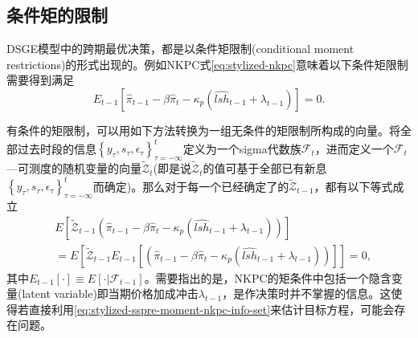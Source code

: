 \subsection{条件矩的限制}
\label{sec:stylized-ssrep-restrictions}
DSGE模型中的跨期最优决策，都是以条件矩限制(conditional moment restrictions)的形式出现的。例如NKPC式\eqref{eq:stylized-nkpc}意味着以下条件矩限制需要得到满足
\begin{equation}
  \label{eq:stylized-sspre-moment-nkpc}
  E_{t-1} \left[
  \hat{\pi}_{t-1} - \beta \hat{\pi}_{t} - \kappa_{p}
  \left(
  \widehat{lsh}_{t-1} + \lambda_{t-1}
  \right)
  \right] = 0.
\end{equation}

有条件的矩限制，可以用如下方法转换为一组无条件的矩限制所构成的向量。将全部过去时段的信息$\left\{ y_{\tau}, s_{\tau}, \epsilon_{\tau} \right\}_{\tau = - \infty}^{t}$定义为一个sigma代数族$\mathcal{F}_{t}$，进而定义一个$\mathcal{F}_{t}$—可测度的随机变量的向量$\widetilde{\mathcal{Z}}_{t}$(即是说$\widetilde{\mathcal{Z}}_{t}$的值可基于全部已有新息$\left\{ y_{\tau}, s_{\tau}, \epsilon_{\tau} \right\}_{\tau = - \infty}^{t}$而确定)。那么对于每一个已经确定了的$\widetilde{\mathcal{Z}}_{t-1}$，都有以下等式成立
\begin{equation}
  \label{eq:stylized-sspre-moment-nkpc-info-set}
\begin{split}
  & E \left[
  \widetilde{\mathcal{Z}}_{t-1}
  \left(
  \hat{\pi}_{t-1} - \beta \hat{\pi}_{t} - \kappa_{p}
  \left(
  \widehat{lsh}_{t-1} + \lambda_{t-1}
  \right)
  \right)
  \right] \\
  & = E \left[
  \widetilde{\mathcal{Z}}_{t-1}
  E_{t-1}
  \left[
  \left(
  \hat{\pi}_{t-1} - \beta \hat{\pi}_{t} - \kappa_{p}
  \left(
  \widehat{lsh}_{t-1} + \lambda_{t-1}
  \right)
  \right)
  \right]
  \right] = 0,
\end{split}
\end{equation}
其中$E_{t-1} \left[ \cdot \right] \equiv E \left[ \cdot | \mathcal{F}_{t-1} \right]$。需要指出的是，NKPC的矩条件中包括一个隐含变量(latent variable)即当期价格加成冲击$\lambda_{t-1}$，是作决策时并不掌握的信息。这使得若直接利用\eqref{eq:stylized-sspre-moment-nkpc-info-set}来估计目标方程，可能会存在问题。

